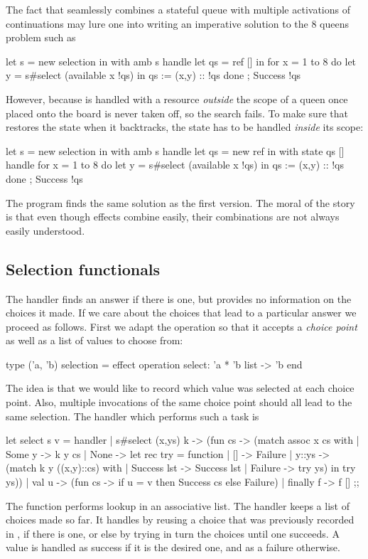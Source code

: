 The fact that  seamlessly combines a stateful queue with multiple activations of continuations may lure one into writing an imperative solution to the 8 queens problem such as
%
\begin{source}
let s = new selection in
with amb s handle
  let qs = ref [] in
  for x = 1 to 8 do
    let y = s#select (available x !qs) in
    qs := (x,y) :: !qs
  done ;
  Success !qs
\end{source}
%
However, because  is handled with a resource \emph{outside} the scope of  a queen once placed onto the board is never taken off, so the search fails. To make sure that  restores the state when it backtracks, the state has to be handled \emph{inside} its scope:
%
\begin{source}
let s = new selection in
with amb s handle
  let qs = new ref in
  with state qs [] handle
    for x = 1 to 8 do
      let y = s#select (available x !qs) in
      qs := (x,y) :: !qs
    done ;
    Success !qs
\end{source}
%
The program finds the same solution as the first version. The moral of the story is that even though effects combine easily, their combinations are not always easily understood.

\subsection{Selection functionals}
\label{sec:select-funct}

The  handler finds an answer if there is one, but provides no information on
the choices it made. If we care about the choices that lead to a particular answer we proceed as follows. First we adapt the  operation so that it accepts a \emph{choice point} as well as a list of values to choose from:
%
\begin{source}
type ('a, 'b) selection = effect
  operation select: 'a * 'b list -> 'b
end
\end{source}
%
The idea is that we would like to record which value was selected at each choice point. Also, multiple invocations of the same choice point should all lead to the same selection.
The handler which performs such a task is
%
\begin{source}
let select s v = handler
  | s#select (x,ys) k -> (fun cs ->
    (match assoc x cs with
     | Some y -> k y cs
     | None ->
         let rec try = function
           | [] -> Failure
           | y::ys ->
               (match k y ((x,y)::cs) with
                  | Success lst -> Success lst
                  | Failure -> try ys)
         in try ys))
  | val u -> (fun cs ->
      if u = v then Success cs else Failure)
  | finally f -> f [] ;;
\end{source}
%
The function  performs lookup in an associative list.
%
The handler keeps a list  of choices made so far. It handles  by reusing a choice that was previously recorded in , if there is one, or else by
trying in turn the choices  until one succeeds. A value is handled as success if it is the desired one, and as a failure otherwise.

